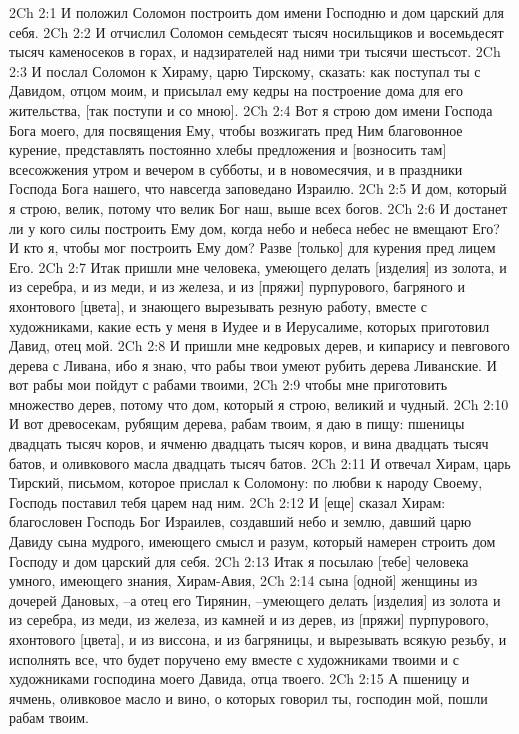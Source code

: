 2Ch 2:1  И положил Соломон построить дом имени Господню и дом царский для себя.
2Ch 2:2  И отчислил Соломон семьдесят тысяч носильщиков и восемьдесят тысяч каменосеков в горах, и надзирателей над ними три тысячи шестьсот.
2Ch 2:3  И послал Соломон к Хираму, царю Тирскому, сказать: как поступал ты с Давидом, отцом моим, и присылал ему кедры на построение дома для его жительства, [так поступи и со мною].
2Ch 2:4  Вот я строю дом имени Господа Бога моего, для посвящения Ему, чтобы возжигать пред Ним благовонное курение, представлять постоянно хлебы предложения и [возносить там] всесожжения утром и вечером в субботы, и в новомесячия, и в праздники Господа Бога нашего, что навсегда заповедано Израилю.
2Ch 2:5  И дом, который я строю, велик, потому что велик Бог наш, выше всех богов.
2Ch 2:6  И достанет ли у кого силы построить Ему дом, когда небо и небеса небес не вмещают Его? И кто я, чтобы мог построить Ему дом? Разве [только] для курения пред лицем Его.
2Ch 2:7  Итак пришли мне человека, умеющего делать [изделия] из золота, и из серебра, и из меди, и из железа, и из [пряжи] пурпурового, багряного и яхонтового [цвета], и знающего вырезывать резную работу, вместе с художниками, какие есть у меня в Иудее и в Иерусалиме, которых приготовил Давид, отец мой.
2Ch 2:8  И пришли мне кедровых дерев, и кипарису и певгового дерева с Ливана, ибо я знаю, что рабы твои умеют рубить дерева Ливанские. И вот рабы мои пойдут с рабами твоими,
2Ch 2:9  чтобы мне приготовить множество дерев, потому что дом, который я строю, великий и чудный.
2Ch 2:10  И вот древосекам, рубящим дерева, рабам твоим, я даю в пищу: пшеницы двадцать тысяч коров, и ячменю двадцать тысяч коров, и вина двадцать тысяч батов, и оливкового масла двадцать тысяч батов.
2Ch 2:11  И отвечал Хирам, царь Тирский, письмом, которое прислал к Соломону: по любви к народу Своему, Господь поставил тебя царем над ним.
2Ch 2:12  И [еще] сказал Хирам: благословен Господь Бог Израилев, создавший небо и землю, давший царю Давиду сына мудрого, имеющего смысл и разум, который намерен строить дом Господу и дом царский для себя.
2Ch 2:13  Итак я посылаю [тебе] человека умного, имеющего знания, Хирам-Авия,
2Ch 2:14  сына [одной] женщины из дочерей Дановых, --а отец его Тирянин, --умеющего делать [изделия] из золота и из серебра, из меди, из железа, из камней и из дерев, из [пряжи] пурпурового, яхонтового [цвета], и из виссона, и из багряницы, и вырезывать всякую резьбу, и исполнять все, что будет поручено ему вместе с художниками твоими и с художниками господина моего Давида, отца твоего.
2Ch 2:15  А пшеницу и ячмень, оливковое масло и вино, о которых говорил ты, господин мой, пошли рабам твоим.
